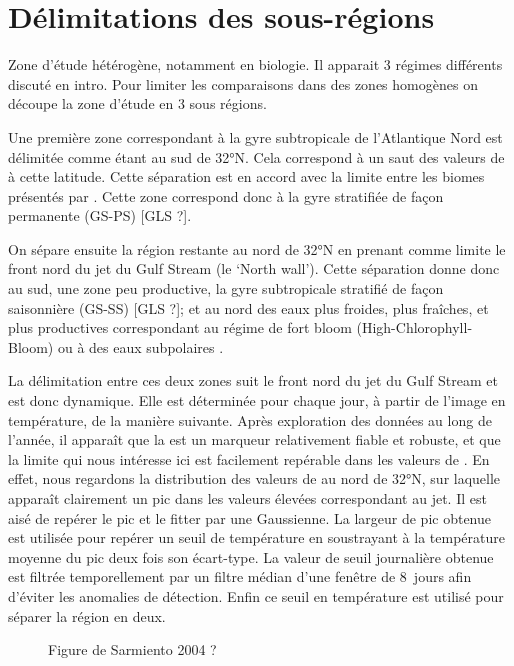 \documentclass[index]{subfiles}
\begin{document}
\section{Délimitations des sous-régions}
\label{sec:delimitations-regions}

Zone d'étude hétérogène, notamment en biologie.
Il apparait 3 régimes différents discuté en intro.
Pour limiter les comparaisons dans des zones homogènes on découpe la zone d'étude en 3 sous régions.

Une première zone correspondant à la gyre subtropicale de l'Atlantique Nord est délimitée comme étant au sud de 32°N.
Cela correspond à un saut des valeurs de  à cette latitude.
Cette séparation est en accord avec la limite entre les biomes présentés par \textcite{sarmiento_2004}.
Cette zone correspond donc à la gyre stratifiée de façon permanente (GS-PS) [GLS ?].

On sépare ensuite la région restante au nord de 32°N en prenant comme limite le front nord du jet du Gulf Stream (le `North wall'). Cette séparation donne donc au sud, une zone peu productive, la gyre subtropicale stratifié de façon saisonnière (GS-SS) [GLS ?]; et au nord des eaux plus froides, plus fraîches, et plus productives correspondant au régime de fort bloom (High-Chlorophyll-Bloom)  ou à des eaux subpolaires .

La délimitation entre ces deux zones suit le front nord du jet du Gulf Stream et est donc dynamique. Elle est déterminée pour chaque jour, à partir de l'image en température, de la manière suivante.
Après exploration des données au long de l'année, il apparaît que la  est un marqueur relativement fiable et robuste, et que la limite qui nous intéresse ici est facilement repérable dans les valeurs de .
En effet, nous regardons la distribution des valeurs de  au nord de 32°N, sur laquelle apparaît clairement un pic dans les valeurs élevées correspondant au jet.
Il est aisé de repérer le pic et le fitter par une Gaussienne. La largeur de pic obtenue est utilisée pour repérer un seuil de température en soustrayant à la température moyenne du pic deux fois son écart-type.
La valeur de seuil journalière obtenue est filtrée temporellement par un filtre médian d'une fenêtre de 8~jours afin d'éviter les anomalies de détection.
Enfin ce seuil en température est utilisé pour séparer la région en deux.

\begin{figure}
  \caption{Figure de Sarmiento 2004 ?}
  \label{fig:sarmiento}
\end{figure}
\end{document}
